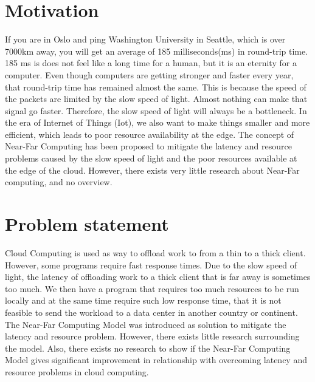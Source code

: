 
\section{Motivation}
If you are in Oslo and ping Washington University in Seattle, which is over 7000km away,  you will get an average of 185 milliseconds(ms) in round-trip time. 185 ms is does not feel like a long time for a human, but it is an eternity for a computer. Even though computers are getting stronger and faster every year, that round-trip time has remained almost the same. This is because the speed of the packets are limited by the slow speed of light. Almost nothing can make that signal go faster. Therefore, the slow speed of light will always be a bottleneck. In the era of Internet of Things (Iot), we also want to make things smaller and more efficient, which leads to poor resource availability at the edge. The concept of Near-Far Computing has been proposed to mitigate the latency and resource problems caused by the slow speed of light and the poor resources available at the edge of the cloud. However, there exists very little research about Near-Far computing, and no overview.



\section{Problem statement}         %
Cloud Computing is used as way to offload work to from a thin to a thick client. However, some programs require fast response times. Due to the slow speed of light, the latency of offloading work to a thick client that is far away is sometimes too much. We then have a program that requires too much resources to be run locally and at the same time require such low response time, that it is not feasible to send the workload to a data center in another country or continent. The Near-Far Computing Model was introduced as solution to mitigate the latency and resource problem. However, there exists little research surrounding the model. Also, there exists no research to show if the Near-Far Computing Model gives significant improvement in relationship with overcoming latency and resource problems in cloud computing.


